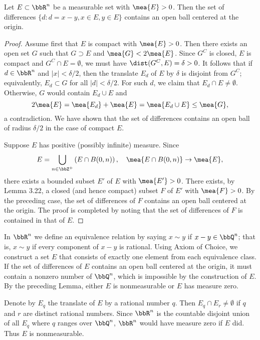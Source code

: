 \begin{lemma}
  Let $E \subset \bbR^n$ be a measurable set with $\mea{E} > 0$.
  Then the set of differences
  $\{d : d = x-y, x \in E, y \in E\}$
  contains an open ball centered at the origin.
\end{lemma}
\begin{proof}
  Assume first that $E$ is compact with $\mea{E} > 0$.
  Then there exists an open set $G$ such that
  $G \supset E$ and $\mea{G} < 2 \mea{E}$.
  Since $G^C$ is closed, $E$ is compact and $G^C \cap E = \emptyset$,
  we must have $\dist(G^C, E) = \delta > 0$.
  It follows that if $d \in \bbR^n$ and $|x| < \delta/2$,
  then the translate $E_{d}$ of $E$ by $\delta$ is disjoint from $G^C$;
  equivalently, $E_{d} \subset G$ for all $|d| < \delta/2$.
  For such $d$, we claim that $E_{d} \cap E \neq \emptyset$.
  Otherwise, $G$ would contain $E_{d} \cup E$ and
  \[
    2 \mea{E} = \mea{E_d} + \mea{E} = \mea{E_d \cup E} \le \mea{G},
  \]
  a contradiction.
  We have shown that the set of differences
  contains an open ball of radius $\delta/2$
  in the case of compact $E$.

  Suppose $E$ has positive (possibly infinite) measure.
  Since
  \[
    E = \bigcup_{n \in \bbZ^+} \left( E \cap B(0, n) \right), \quad
    \mea{E \cap B(0,n)} \rightarrow \mea{E},
  \]
  there exists a bounded subset $E'$ of $E$ with $\mea{E'} > 0$.
  There exists, by Lemma 3.22,
  a closed (and hence compact) subset $F$ of $E'$ with $\mea{F} > 0$.
  By the preceding case, the set of differences of $F$
  contains an open ball centered at the origin.
  The proof is completed by noting that
  the set of differences of $F$ is contained in that of $E$.
\end{proof}

\begin{exercise}{3.19}
  In $\bbR^n$ we define an equivalence relation by saying
  $x \sim y$ if $x - y \in \bbQ^n$;
  that is, $x \sim y$ if every component of $x-y$ is rational.
  Using Axiom of Choice,
  we construct a set $E$ that consists of exactly one element
  from each equivalence class.
  If the set of differences of $E$ contains an open ball centered at the origin,
  it must contain a nonzero number of $\bbQ^n$,
  which is impossible by the construction of $E$.
  By the preceding Lemma,
  either $E$ is nonmeasurable or $E$ has measure zero.

  Denote by $E_q$ the translate of $E$ by a rational number $q$.
  Then $E_q \cap E_r \neq \emptyset$ if $q$ and $r$ are distinct rational numbers.
  Since $\bbR^n$ is the countable disjoint union of all $E_q$
  where $q$ ranges over $\bbQ^n$,
  $\bbR^n$ would have measure zero if $E$ did.
  Thus $E$ is nonmeasurable.
\end{exercise}

